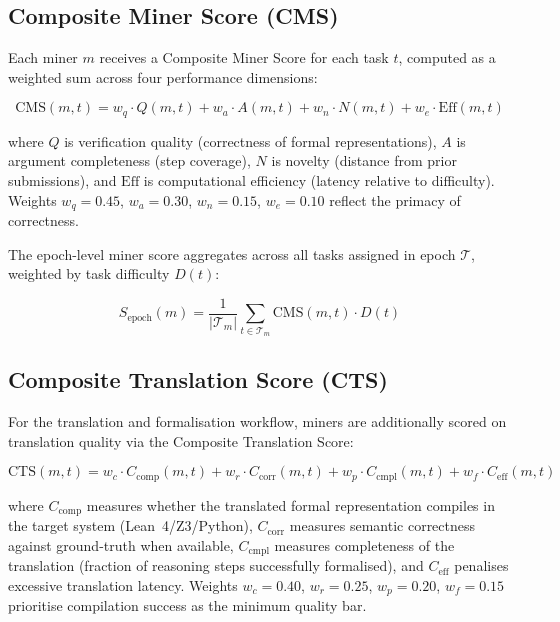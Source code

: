 \documentclass[11pt,a4paper]{article}
\begin{document}
\subsection{Composite Miner Score (CMS)}

Each miner $m$ receives a Composite Miner Score for each task $t$,
computed as a weighted sum across four performance dimensions:

\begin{equation}
  \text{CMS}(m, t) = w_q \cdot Q(m,t) + w_a \cdot A(m,t)
    + w_n \cdot N(m,t) + w_e \cdot \text{Eff}(m,t)
  \label{eq:cms}
\end{equation}

\noindent where $Q$ is verification quality (correctness of formal
representations), $A$ is argument completeness (step coverage), $N$ is
novelty (distance from prior submissions), and $\text{Eff}$ is
computational efficiency (latency relative to difficulty).  Weights
$w_q = 0.45$, $w_a = 0.30$, $w_n = 0.15$, $w_e = 0.10$ reflect the
primacy of correctness.

The epoch-level miner score aggregates across all tasks assigned in epoch
$\mathcal{T}$, weighted by task difficulty $D(t)$:

\begin{equation}
  S_{\text{epoch}}(m) = \frac{1}{|\mathcal{T}_m|}
    \sum_{t \in \mathcal{T}_m} \text{CMS}(m, t) \cdot D(t)
  \label{eq:sepoch}
\end{equation}

\subsection{Composite Translation Score (CTS)}

For the translation and formalisation workflow, miners are additionally
scored on translation quality via the Composite Translation Score:

\begin{equation}
  \text{CTS}(m, t) = w_c \cdot C_{\text{comp}}(m,t)
    + w_r \cdot C_{\text{corr}}(m,t)
    + w_p \cdot C_{\text{cmpl}}(m,t)
    + w_f \cdot C_{\text{eff}}(m,t)
  \label{eq:cts}
\end{equation}

\noindent where $C_{\text{comp}}$ measures whether the translated formal
representation compiles in the target system (Lean~4/Z3/Python),
$C_{\text{corr}}$ measures semantic correctness against ground-truth when
available, $C_{\text{cmpl}}$ measures completeness of the translation
(fraction of reasoning steps successfully formalised), and
$C_{\text{eff}}$ penalises excessive translation latency.  Weights
$w_c = 0.40$, $w_r = 0.25$, $w_p = 0.20$, $w_f = 0.15$ prioritise
compilation success as the minimum quality bar.
\end{document}
